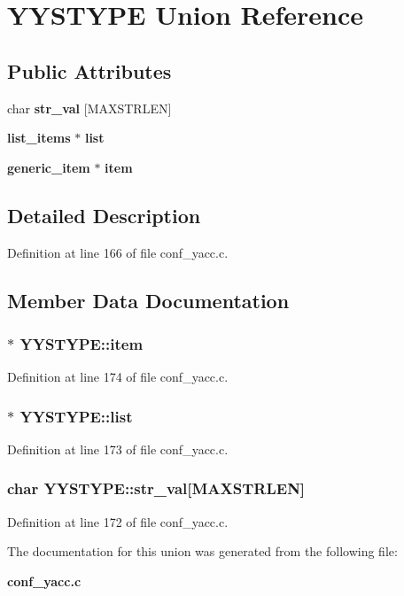 \section{YYSTYPE Union Reference}
\label{unionYYSTYPE}
\subsection*{Public Attributes}
\begin{DoxyCompactItemize}
\item 
char {\bf str\_\-val} [MAXSTRLEN]
\item 
{\bf list\_\-items} $\ast$ {\bf list}
\item 
{\bf generic\_\-item} $\ast$ {\bf item}
\end{DoxyCompactItemize}


\subsection{Detailed Description}


Definition at line 166 of file conf\_\-yacc.c.

\subsection{Member Data Documentation}
\subsubsection[{item}]{$\ast$ {\bf YYSTYPE::item}}\label{unionYYSTYPE_aec78baf3d9add65c2e0d4555fb19af87}


Definition at line 174 of file conf\_\-yacc.c.
\subsubsection[{list}]{$\ast$ {\bf YYSTYPE::list}}\label{unionYYSTYPE_a6fd5a12753b8acea6f9bb065fd978df3}


Definition at line 173 of file conf\_\-yacc.c.
\subsubsection[{str\_\-val}]{\setlength{\rightskip}{0pt plus 5cm}char {\bf YYSTYPE::str\_\-val}[MAXSTRLEN]}\label{unionYYSTYPE_ad82f920247734a90a4435b2937dfa2f5}


Definition at line 172 of file conf\_\-yacc.c.

The documentation for this union was generated from the following file:\begin{DoxyCompactItemize}
\item 
{\bf conf\_\-yacc.c}\end{DoxyCompactItemize}
